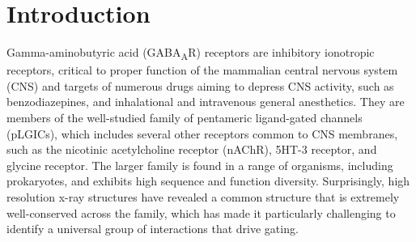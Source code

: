 \documentclass[journal=jacsat,manuscript=article]{achemso}
\newcommand{\GABAA}{GABA\textsubscript{A}R\xspace}
\begin{document}

\section{Introduction}

Gamma-aminobutyric acid (\GABAA) receptors are inhibitory ionotropic receptors, critical to proper function of the mammalian central nervous system (CNS) and targets of numerous drugs aiming to depress CNS activity, such as benzodiazepines\cite{Sigel1997}, and inhalational and intravenous general anesthetics.\cite {Krasowski1999,Harris1995,Miller2002} They are members of the well-studied family of pentameric ligand-gated channels (pLGICs), which includes several other receptors common to CNS membranes, such as the nicotinic acetylcholine receptor (nAChR), 5HT-3 receptor, and glycine receptor. The larger family is found in a range of organisms, including prokaryotes, and exhibits high sequence and function diversity.  Surprisingly, high resolution x-ray structures have revealed a common structure that is extremely well-conserved across the family,  \cite{Miller2014, Hassaine2014,Du2015,Hilf2008,Bocquet2009,Gonzalez-Gutierrez2013, Sauguet2014, Hibbs2011a,Althoff2014,Spurny2012}   %
which has made it particularly challenging to identify a universal group of interactions that drive gating.  
\end{document}
